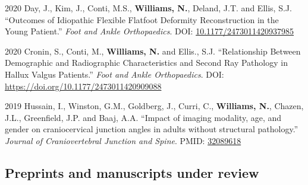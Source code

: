 \documentclass[12pt,letterpaper]{report}
\begin{document}
\begin{tablist}
	\item[2020] \tab Day, J., Kim, J., Conti, M.S., \textbf{Williams, N.}, Deland, J.T. and Ellis, S.J. \enquote{Outcomes of Idiopathic Flexible Flatfoot Deformity Reconstruction in the Young Patient.} \textit{Foot and Ankle Orthopaedics}. DOI: \href{https://doi.org/10.1177/2473011420937985}{10.1177/2473011420937985}
	
	\item[2020] \tab Cronin, S., Conti, M., \textbf{Williams, N.} and Ellis., S.J. \enquote{Relationship Between Demographic and Radiographic Characteristics and Second Ray Pathology in Hallux Valgus Patients.} \textit{Foot and Ankle Orthopaedics}. DOI: \href{https://doi.org/10.1177/2473011420909088}{https://doi.org/10.1177/2473011420909088}

	\item[2019] \tab Hussain, I., Winston, G.M., Goldberg, J., Curri, C., \textbf{Williams, N.}, Chazen, J.L., Greenfield, J.P. and Baaj, A.A. \enquote{Impact of imaging modality, age, and gender on craniocervical junction angles in adults without structural pathology.} \textit{Journal of Craniovertebral Junction and Spine}. PMID: \href{https://www.ncbi.nlm.nih.gov/pubmed/32089618}{32089618}

    \end{tablist}
    
    \subsection*{Preprints and manuscripts under review}
    
\end{document}

